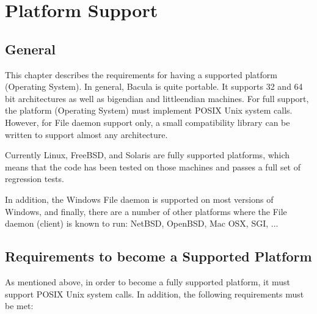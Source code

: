 
\chapter{Platform Support}
\label{_PlatformChapter}

\section{General}

This chapter describes the requirements for having a 
supported platform (Operating System).  In general, Bacula is
quite portable. It supports 32 and 64 bit architectures as well
as bigendian and littleendian machines. For full         
support, the platform (Operating System) must implement POSIX Unix 
system calls.  However, for File daemon support only, a small
compatibility library can be written to support almost any 
architecture.

Currently Linux, FreeBSD, and Solaris are fully supported
platforms, which means that the code has been tested on those
machines and passes a full set of regression tests.

In addition, the Windows File daemon is supported on most versions  
of Windows, and finally, there are a number of other platforms  
where the File daemon (client) is known to run: NetBSD, OpenBSD, 
Mac OSX, SGI, ...

\section{Requirements to become a Supported Platform}

As mentioned above, in order to become a fully supported platform, it
must support POSIX Unix system calls.  In addition, the following
requirements must be met:


